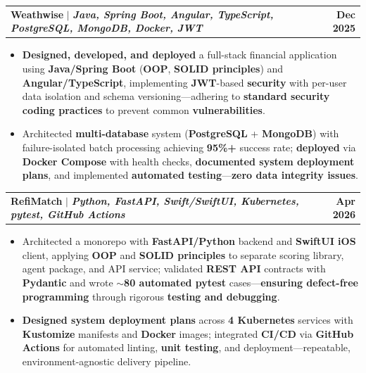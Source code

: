 \documentclass[letterpaper,10pt]{article}
\makeatletter
\newcommand{\resumeItem}[1]{
  \item\small{
    {#1 \vspace{-1pt}}
  }
}
\newcommand{\resumeProjectHeading}[2]{
    \item
    \begin{tabular*}{1.001\textwidth}{l@{\extracolsep{\fill}}r}
      \small#1 & \textbf{\small #2}\\
    \end{tabular*}\vspace{-9pt}
}
\newcommand{\resumeItemListStart}{\begin{itemize}[leftmargin=0.15in]}
\newcommand{\resumeItemListEnd}{\end{itemize}\vspace{-4pt}}
\makeatother
\begin{document}
    \resumeProjectHeading
          {\textbf{Weathwise} $|$ \emph{\textbf{Java, Spring Boot, Angular, TypeScript, PostgreSQL, MongoDB, Docker, JWT}}}{Dec 2025}
          \resumeItemListStart
            \resumeItem{\textbf{Designed, developed, and deployed} a full-stack financial application using \textbf{Java/Spring Boot} (\textbf{OOP}, \textbf{SOLID principles}) and \textbf{Angular/TypeScript}, implementing \textbf{JWT}-based \textbf{security} with per-user data isolation and schema versioning---adhering to \textbf{standard security coding practices} to prevent common \textbf{vulnerabilities}.}
            \vspace{-2pt}
            \resumeItem{Architected \textbf{multi-database} system (\textbf{PostgreSQL} + \textbf{MongoDB}) with failure-isolated batch processing achieving \textbf{95\%+} success rate; \textbf{deployed} via \textbf{Docker Compose} with health checks, \textbf{documented system deployment plans}, and implemented \textbf{automated testing}---\textbf{zero data integrity issues}.}
          \resumeItemListEnd 
          \vspace{-18pt}

      \resumeProjectHeading
          {\textbf{RefiMatch} $|$ \emph{\textbf{Python, FastAPI, Swift/SwiftUI, Kubernetes, pytest, GitHub Actions}}}{Apr 2026}
          \resumeItemListStart
            \resumeItem{Architected a monorepo with \textbf{FastAPI/Python} backend and \textbf{SwiftUI iOS} client, applying \textbf{OOP} and \textbf{SOLID principles} to separate scoring library, agent package, and API service; validated \textbf{REST API} contracts with \textbf{Pydantic} and wrote \textbf{$\sim$80 automated pytest} cases---\textbf{ensuring defect-free programming} through rigorous \textbf{testing and debugging}.}
            \vspace{-2pt}
            \resumeItem{\textbf{Designed system deployment plans} across \textbf{4 Kubernetes} services with \textbf{Kustomize} manifests and \textbf{Docker} images; integrated \textbf{CI/CD} via \textbf{GitHub Actions} for automated linting, \textbf{unit testing}, and deployment---repeatable, environment-agnostic delivery pipeline.}
          \resumeItemListEnd
          \vspace{-18pt}
\end{document}
